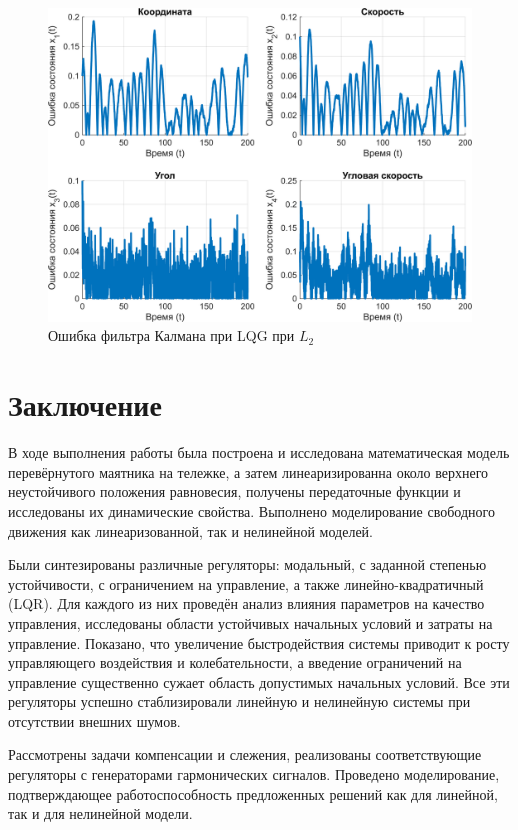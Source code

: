 \begin{figure}[H]
    \centering
    \includegraphics[width=0.9\linewidth]{figs/6.5.sim.2.err.png}
    \caption{Ошибка фильтра Калмана при LQG при $L_2$}
    \label{fig:6.5.sim.2.err}
\end{figure}

\chapter*{Заключение}

В ходе выполнения работы была построена и исследована математическая модель 
перевёрнутого маятника на тележке, а затем линеаризированна около верхнего неустойчивого 
положения равновесия, получены передаточные функции 
и исследованы их динамические свойства. Выполнено моделирование 
свободного движения как линеаризованной, так и нелинейной моделей.

Были синтезированы различные регуляторы: модальный, с заданной 
степенью устойчивости, с ограничением на управление, а также 
линейно-квадратичный (LQR). Для каждого из них проведён анализ 
влияния параметров на качество управления, исследованы области 
устойчивых начальных условий и затраты на управление. Показано, 
что увеличение быстродействия системы приводит к росту управляющего 
воздействия и колебательности, а введение ограничений на управление 
существенно сужает область допустимых начальных условий. Все эти регуляторы
успешно стаблизировали линейную и нелинейную системы при отсутствии 
внешних шумов.

Рассмотрены задачи компенсации и слежения, реализованы соответствующие 
регуляторы с генераторами гармонических сигналов. 
Проведено моделирование, подтверждающее работоспособность предложенных 
решений как для линейной, так и для нелинейной модели.

